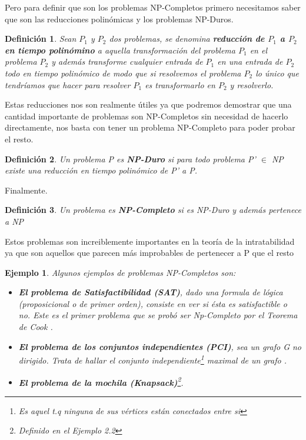 \documentclass[a4paper,12pt,titlepage]{article}
\newtheorem{defi}{Definici\'on}[section]
\newtheorem{eje}{Ejemplo}[section]
\begin{document}
Pero para definir que son los problemas NP-Completos primero necesitamos
saber que son las reducciones polin\'omicas y los problemas NP-Duros.

\begin{defi}

Sean $P_{1}$ y $P_{2}$ dos problemas, se denomina \textbf{reducci\'on de $P_{1}$ a $P_{2}$ en tiempo polin\'omino} a aquella transformaci\'on del problema $P_{1}$ en el problema $P_{2}$ y adem\'as transforme cualquier entrada de $P_{1}$ en una entrada de $P_{2}$ todo en tiempo polin\'omico de modo que si resolvemos el problema $P_{2}$ lo \'unico que tendr\'iamos que hacer para resolver $P_{1}$ es transformarlo en $P_{2}$ y resolverlo.

\end{defi}

Estas reducciones nos son realmente \'utiles ya que podremos demostrar
que una cantidad importante de problemas son NP-Completos sin necesidad
de hacerlo directamente, nos basta con tener un problema NP-Completo para
poder probar el resto.

\begin{defi}

Un problema P es \textbf{NP-Duro} si para todo problema P' $\in$ NP existe una reducci\'on en tiempo polin\'omico de P' a P.

\end{defi}

Finalmente.

\begin{defi}

Un problema es \textbf{NP-Completo} si es NP-Duro y adem\'as pertenece a NP

\end{defi}

Estos problemas son increiblemente importantes en la teor\'ia de la intratabilidad ya que son aquellos que parecen m\'as improbables de pertenecer a P que el resto

\begin{eje}

Algunos ejemplos de problemas NP-Completos son:

\begin{itemize}

  \item \textbf{El problema de Satisfactibilidad (SAT)}, dado una formula de l\'ogica (proposicional o de primer orden), consiste en ver si \'esta es satisfactible o no. Este es el primer problema que se prob\'o ser Np-Completo por el Teorema de Cook \cite{AroraBarak}.
  \item \textbf{El problema de los conjuntos independientes (PCI)}, sea un grafo G no dirigido. Trata de hallar el conjunto independiente\footnote{Es aquel t.q ninguna de sus v\'ertices est\'an conectados entre si} maximal de un grafo \cite{approx_core}.
  \item \textbf{El problema de la mochila (Knapsack)}\footnote{Definido en el Ejemplo 2.2}.
  
\end{itemize}

\end{eje}
\end{document}
